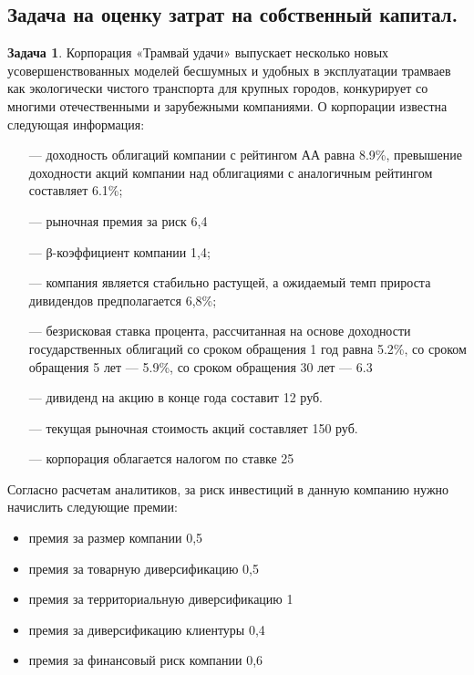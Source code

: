 \documentclass[a4paper, 14pt]{article}
\theoremstyle{plain} %
\theoremstyle{definition} %
\newtheorem{problem}{Задача}[subsection]
\theoremstyle{remark} %
\begin{document}
\subsection{Задача на оценку затрат на собственный капитал.}
\begin{problem}
		Корпорация «Трамвай удачи» выпускает несколько новых усовершенствованных моделей  бесшумных  и  удобных  в эксплуатации  трамваев  как  экологически  чистого транспорта для крупных городов, конкурирует со многими отечественными и зарубежными компаниями. О корпорации известна следующая информация:
		\begin{itemize}
			\item[---] доходность облигаций компании с рейтингом АА равна 8.9\%, превышение доходности акций компании над облигациями с аналогичным рейтингом составляет 6.1\%;
			\item[---] рыночная премия за риск 6,4%
			\item[---] β-коэффициент компании 1,4;
			\item[---] компания является стабильно растущей, а ожидаемый темп прироста дивидендов предполагается 6,8\%;
			\item[---] безрисковая ставка процента, рассчитанная на основе доходности государственных облигаций со сроком обращения 1 год равна 5.2\%, со сроком обращения 5 лет --- 5.9\%, со сроком обращения 30 лет --- 6.3%
			\item[---] дивиденд на акцию в конце года составит 12 руб.
			\item[---] текущая рыночная стоимость акций составляет 150 руб.
			\item[---] корпорация облагается налогом по ставке 25%
		\end{itemize}

		Согласно расчетам  аналитиков,  за  риск  инвестиций  в  данную  компанию  нужно начислить следующие премии:
		\begin{itemize}
			\item премия за размер компании 0,5%
			\item премия за товарную диверсификацию 0,5%
			\item премия за территориальную диверсификацию 1%
			\item премия за диверсификацию клиентуры 0,4%
			\item премия за финансовый риск компании 0,6%
		\end{itemize}


\end{problem}
\end{document}
